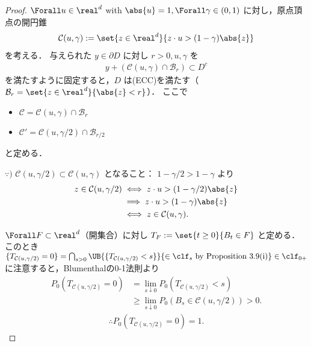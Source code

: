 \documentclass{jsarticle}
\begin{document}
\begin{proof}
    $\Forall u\in\real^d$ with $\abs{u}=1, \Forall \gamma\in(0, 1)$ に対し，原点頂点の開円錐
    \begin{align}
        \mathcal{C}(u, \gamma)
        := \set{z\in\real^d}{z\cdot u>(1-\gamma)\abs{z}}
    \end{align}
    を考える．
    与えられた $y\in\partial D$ に対し $r>0, u, \gamma$ を
    \begin{align}
        y+(\mathcal{C}(u, \gamma)\cap\mathcal{B}_{r})\subset D^c
    \end{align}
    を満たすように固定すると，$D$ は(ECC)を満たす（$\mathcal{B}_{r}=\set{z\in\real^d}{\abs{z}<r}$）．
    ここで
    \begin{itemize}
        \item $\mathcal{C}=\mathcal{C}(u, \gamma)\cap\mathcal{B}_{r}$
        \item $\mathcal{C}'=\mathcal{C}(u, \gamma/2)\cap\mathcal{B}_{r/2}$
    \end{itemize}
    と定める．
    
    \begin{screen}
        $\because)$
        $\mathcal{C}(u, \gamma/2)\subset \mathcal{C}(u, \gamma)$ となること：
        $1-\gamma/2>1-\gamma$ より
        \begin{align}
            z\in\mathcal{C}(u, \gamma/2)
            &\iff z\cdot u>(1-\gamma/2)\abs{z} \\
            &\implies z\cdot u>(1-\gamma)\abs{z} \\
            &\iff z\in\mathcal{C}(u, \gamma).
        \end{align}
    \end{screen}

    $\Forall F\subset \real^d$（開集合）に対し $T_F:=\set{t\ge0}{B_t\in F}$ と定める．
    このとき $\{T_{\mathcal{C}(u, \gamma/2)}=0\}=\bigcap_{s>0}\UB{\{T_{\mathcal{C}(u, \gamma/2)}<s\}}{\in\clf_s\text{ by Proposition 3.9(i)}}\in\clf_{0+}$ に注意すると，Blumenthalの0-1法則より
    \begin{align}
        P_0(T_{\mathcal{C}(u, \gamma/2)}=0)
        &= \lim_{s\downarrow0}P_0(T_{\mathcal{C}(u, \gamma/2)}<s) \\
        &\ge \lim_{s\downarrow0}P_0(B_s\in\mathcal{C}(u, \gamma/2)) > 0.
    \end{align}
    \begin{gather}
        \therefore 
        P_0(T_{\mathcal{C}(u, \gamma/2)}=0) = 1.
    \end{gather}


\end{proof}
\end{document}
